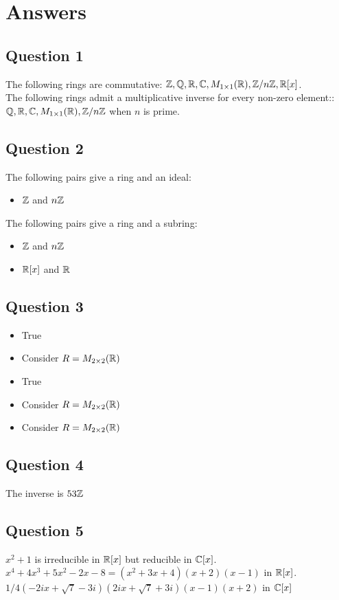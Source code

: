 \documentclass[a4paper]{article}
\begin{document}
\pagebreak
\section*{Answers}
\subsection*{Question 1}
The following rings are commutative: $\mathbb{Z},\mathbb{Q},\mathbb{R},\mathbb{C},M_{1\times 1}(\mathbb{R}),\mathbb{Z}/n\mathbb{Z},\mathbb{R}[x]$. \\

The following rings admit a multiplicative inverse for every non-zero element:: $\mathbb{Q},\mathbb{R},\mathbb{C},M_{1\times 1}(\mathbb{R}),\mathbb{Z}/n\mathbb{Z}$ when $n$ is prime. 

\subsection*{Question 2}
The following pairs give a ring and an ideal: 
\begin{itemize}
\item $\mathbb{Z}$ and $n\mathbb{Z}$
\end{itemize}

The following pairs give a ring and a subring: 
\begin{itemize}
\item $\mathbb{Z}$ and $n\mathbb{Z}$
\item $\mathbb{R}[x]$ and $\mathbb{R}$
\end{itemize}

\subsection*{Question 3}
\begin{itemize}
\item True
\item Consider $R=M_{2\times 2}(\mathbb{R})$
\item True
\item Consider $R=M_{2\times 2}(\mathbb{R})$
\item Consider $R=M_{2\times 2}(\mathbb{R})$
\end{itemize}

\subsection*{Question 4}
The inverse is $53\mathbb{Z}$

\subsection*{Question 5}
$x^2+1$ is irreducible in $\mathbb{R}[x]$ but reducible in $\mathbb{C}[x]$. \\

$x^4+4x^3+5x^2-2x-8=(x^2+3x+4)(x+2)(x-1)$ in $\mathbb{R}[x]$. \\
$1/4 (-2 i x + \sqrt{7} - 3 i) (2 i x + \sqrt{7} + 3 i) (x - 1) (x + 2)$ in $\mathbb{C}[x]$
\end{document}
